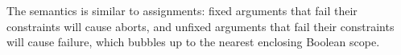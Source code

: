 \documentclass[10pt]{scrartcl}
\begin{document}
The semantics is similar to assignments:  fixed arguments that fail their constraints
will cause aborts, and unfixed arguments that fail their constraints will
cause failure, which bubbles up to the nearest enclosing Boolean scope.

%
%
%
%
%

\end{document}
